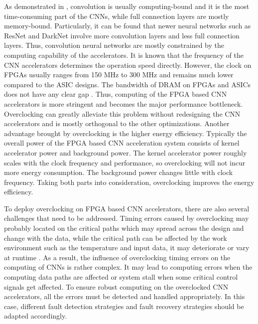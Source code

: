As demonstrated in \cite{Caffeine_6}, convolution is usually 
computing-bound and it is the most time-consuming part of the CNNs, while 
full connection layers are mostly memory-bound. Particularly, it can be found that 
newer neural networks such as ResNet and DarkNet involve more 
convolution layers and less full connection layers. Thus, convolution neural 
networks are mostly constrained by the computing capability of the accelerators. 
It is known that the frequency of the CNN 
accelerators determines the operation speed directly. However, 
the clock on FPGAs usually ranges from 150 MHz to 300 MHz and 
remains much lower compared to the ASIC designs. The 
bandwidth of DRAM on FPGAs and ASICs does not have any 
clear gap \cite{asic_fpga}. Thus, computing of the FPGA based CNN 
accelerators is more stringent and becomes the major 
performance bottleneck. Overclocking can greatly alleviate this 
problem without redesigning the CNN accelerators and is 
mostly orthogonal to the other optimizations. 
Another advantage brought by overclocking is the higher 
energy efficiency. Typically the overall power of the 
FPGA based CNN acceleration system consists of kernel accelerator power 
and background power. The kernel accelerator power 
roughly scales with the clock frequency and performance, 
so overclocking will not incur more energy consumption. 
The background power changes little with clock frequency. 
Taking both parts into consideration, overclocking improves the energy efficiency.

To deploy overclocking on FPGA based CNN accelerators, there are also several
challenges that need to be addressed. Timing errors caused by overclocking 
may probably located on the critical paths which may spread across the 
design and change with the data, while the critical path can be
affected by the work environment such as the temperature 
and input data, it may deteriorate or vary at runtime \cite{Paceline_15}. 
As a result, the influence of overclocking timing 
errors on the computing of CNNs is rather complex. It may lead to
computing errors when the computing data paths are affected or system stall 
when some critical control signals get affected. To ensure robust computing 
on the overclocked CNN accelerators, all the errors must be detected and 
handled appropriately. In this case, different fault detection strategies 
and fault recovery strategies should be adapted accordingly. 

